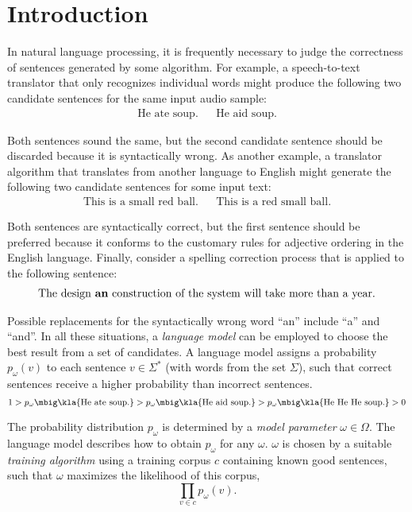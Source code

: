 \chapter{Introduction}

In natural language processing, it is frequently necessary to judge the
correctness of sentences generated by some algorithm. For example, a
speech-to-text translator that only recognizes individual words might produce
the following two candidate sentences for the same input audio sample:
\begin{align*}
 \text{He ate soup.} &&
 \text{He aid soup.}
\end{align*}

Both sentences sound the same, but the second candidate sentence should be
discarded because it is syntactically wrong. As another example, a translator
algorithm that translates from another language to English might generate the
following two candidate sentences for some input text:
\begin{align*}
 \text{This is a small red ball.} &&
 \text{This is a red small ball.}
\end{align*}

Both sentences are syntactically correct, but the first sentence should be
preferred because it conforms to the customary rules for adjective ordering in
the English language. Finally, consider a spelling correction process that is
applied to the following sentence: \cite{kukich1992}
\begin{align*}
 \text{The design \textbf{an} construction of the system will take more than a year.}
\end{align*}

Possible replacements for the syntactically wrong word ``an'' include ``a'' and
``and''. In all these situations, a \emph{language model} can be employed to
choose the best result from a set of candidates.
\cite{stolcke2002,youngetal2005} A language model assigns a probability $p_\omega(v)$
to each sentence $v\in\Sigma^*$ (with words from the set $\Sigma$), such that
correct sentences receive a higher probability than incorrect sentences.
\[
 1 > p_\omega\mbig\kla{\text{He ate soup.}} > p_\omega\mbig\kla{\text{He aid soup.}} > p_\omega\mbig\kla{\text{He He He soup.}} > 0
\]

The probability distribution $p_\omega$ is determined by a \emph{model
parameter} $\omega\in\Omega$. The language model describes how to obtain
$p_\omega$ for any $\omega$. $\omega$ is chosen by a suitable \emph{training
algorithm} using a training corpus $c$ containing known good sentences, such
that $\omega$ maximizes the likelihood of this corpus,
\[
 \prod_{v\in c} p_\omega(v).
\]

